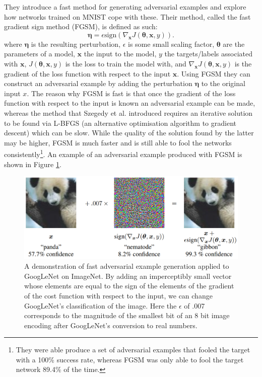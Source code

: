 \documentclass{article}
\begin{document}
They introduce a fast method for generating adversarial examples and explore how networks trained on MNIST cope with these. Their method, called the fast gradient sign method (FGSM), is defined as such:
\begin{equation} \label{eq:fgsm}
    \boldsymbol{\eta} = \epsilon \text{sign} (\nabla_{\mathbf{x}} J(\boldsymbol{\theta}, \mathbf{x}, y)).
\end{equation}
where $\boldsymbol{\eta}$ is the resulting perturbation, $\epsilon$ is some small scaling factor, $\boldsymbol{\theta}$ are the parameters of a model, $\mathbf{x}$ the input to the model, $y$ the targets/labels associated with $\mathbf{x}$, $J(\boldsymbol{\theta}, \mathbf{x}, y)$ is the loss to train the model with, and $\nabla_{\mathbf{x}} J(\boldsymbol{\theta}, \mathbf{x}, y)$ is the gradient of the loss function with respect to the input $\mathbf{x}$. 
Using FGSM they can construct an adversarial example by adding the perturbation $\boldsymbol{\eta}$ to the original input $x$. The reason why FGSM is fast is that once the gradient of the loss function with respect to the input is known an adversarial example can be made, whereas the method that Szegedy et al. introduced requires an iterative solution to be found via L-BFGS (an alternative optimisation algorithm to gradient descent) which can be slow.
While the quality of the solution found by the latter may be higher, FGSM is much faster and is still able to fool the networks consistently\footnote{They were able produce a set of adversarial examples that fooled the target with a 100\% success rate, whereas FGSM was only able to fool the target network 89.4\% of the time.}. An example of an adversarial example produced with FGSM is shown in Figure \ref{fig:panda_example_gibbon}.

\begin{figure}
    \centering
    \includegraphics[width=\linewidth]{figures/panda-example-gibbon.png}
    \caption{A demonstration of fast adversarial example generation applied to GoogLeNet \cite{szegedy2015going} on ImageNet. By adding an imperceptibly small vector whose elements are equal to the sign of the elements of the gradient of the cost function with respect to the input, we can change GoogLeNet’s classification of the image. Here the $\epsilon$ of .007 corresponds to the magnitude of the smallest bit of an 8 bit image encoding after GoogLeNet’s conversion to real numbers.\protect\footnotemark}
    \label{fig:panda_example_gibbon}
\end{figure}
\end{document}
